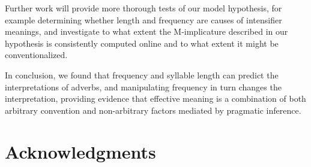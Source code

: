 \documentclass[10pt,letterpaper]{article}
\newcommand{\todo}[1]{{\color{red}#1}}
\begin{document}
Further work will provide more thorough tests of our model hypothesis, for example determining whether length and frequency are causes of intensifier meanings, and investigate to what extent the M-implicature described in our hypothesis is consistently computed online and to what extent it might be conventionalized.





In conclusion, we found that frequency and syllable length can predict the interpretations of adverbs, and manipulating frequency in turn changes the interpretation, providing evidence that effective meaning is a combination of both arbitrary convention and non-arbitrary factors mediated by pragmatic inference.






\section{Acknowledgments}

\nocite{web1t5gram}
\nocite{lewis}
\nocite{saussure}



\setlength{\bibleftmargin}{.125in}
\setlength{\bibindent}{-\bibleftmargin}


\end{document}
